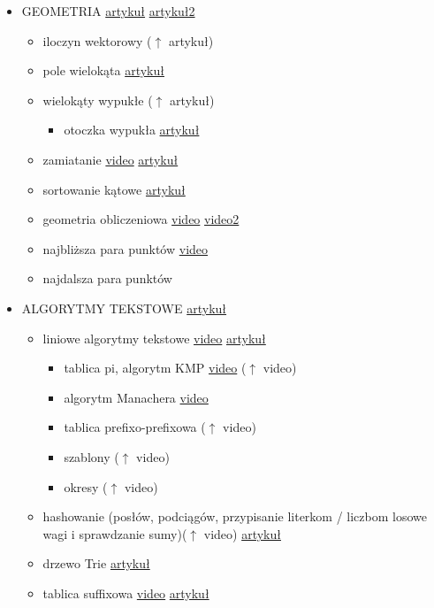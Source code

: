 \documentclass[15pt]{article}
\begin{document}
\begin{itemize}
    \item GEOMETRIA \href{http://kompendium.meetit.pl/kurs#geo1}{artykuł} \href{http://informatyka.wroc.pl/node/455?page=0,0}{artykuł2}
    \begin{itemize}
        \item iloczyn wektorowy ($\uparrow$ artykuł)
        \item pole wielokąta \href{http://kompendium.meetit.pl/kurs#geo2}{artykuł}
        \item wielokąty wypukłe ($\uparrow$ artykuł)
        \begin{itemize}
            \item otoczka wypukła \href{http://kompendium.meetit.pl/kurs#geo4}{artykuł}
        \end{itemize}
        \item zamiatanie \href{http://was.zaa.mimuw.edu.pl/?q=node/37}{video} \href{http://kompendium.meetit.pl/kurs#geo5}{artykuł}
        \item sortowanie kątowe \href{http://kompendium.meetit.pl/kurs#geo3}{artykuł}
        \item geometria obliczeniowa \href{http://was.zaa.mimuw.edu.pl/?q=node/15}{video} \href{http://was.zaa.mimuw.edu.pl/?q=node/45}{video2}
        \item najbliższa para punktów \href{http://was.zaa.mimuw.edu.pl/?q=node/37}{video}
        \item najdalsza para punktów
    \end{itemize}
    
    \item ALGORYTMY TEKSTOWE \href{http://kompendium.meetit.pl/kurs#text1}{artykuł}
    \begin{itemize}
        \item liniowe algorytmy tekstowe \href{http://was.zaa.mimuw.edu.pl/?q=node/5}{video} \href{http://kompendium.meetit.pl/kurs#text3}{artykuł}
        \begin{itemize}
            \item tablica pi, algorytm KMP \href{http://solve.edu.pl/~sparingi/resources}{video} ($\uparrow$ video)
            \item algorytm Manachera \href{http://was.zaa.mimuw.edu.pl/?q=node/5}{video}
            \item tablica prefixo-prefixowa ($\uparrow$ video)
            \item szablony ($\uparrow$ video)
            \item okresy ($\uparrow$ video)
        \end{itemize}
        \item hashowanie (posłów, podciągów, przypisanie literkom / liczbom losowe wagi i sprawdzanie sumy)($\uparrow$ video) \href{http://kompendium.meetit.pl/kurs#text2}{artykuł}
        \item drzewo Trie \href{http://kompendium.meetit.pl/kurs#text4}{artykuł}
        \item tablica suffixowa \href{http://solve.edu.pl/~sparingi/resources}{video} \href{http://kompendium.meetit.pl/kurs#text7}{artykuł}
    \end{itemize}
    

\end{itemize}
\end{document}

